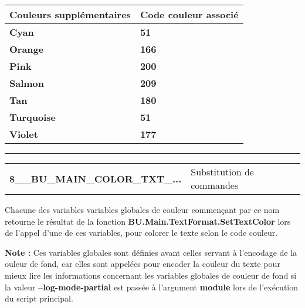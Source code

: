 \documentclass[a4paper,10pt]{article}
\begin{document}
\begin{justify}
    \begin{tabular}{|l|l|}
        \hline
        \textbf{Couleurs supplémentaires} & \textbf{Code couleur associé}\\
        \hline
        \textbf{\color{Cyan}Cyan} & \textbf{\color{Cyan}51}\\
        \hline
        \textbf{\color{Orange}Orange} & \textbf{\color{Orange}166}\\
        \hline
        \textbf{\color{Pink}Pink} & \textbf{\color{Pink}200}\\
        \hline
        \textbf{\color{Salmon}Salmon} & \textbf{\color{Salmon}209}\\
        \hline
        \textbf{\color{Tan}Tan} & \textbf{\color{Tan}180}\\
        \hline
        \textbf{\color{Turquoise}Turquoise} & \textbf{\color{Turquoise}51}\\
        \hline
        \textbf{\color{Violet}Violet} & \textbf{\color{Violet}177}\\
        \hline
    \end{tabular}
\end{justify}

\setlength{\parskip}{2em}


\par\noindent\rule{\textwidth}{0.4pt}

\setlength{\parskip}{1em}

\begin{justify}
    \begin{tabular}{l|l}
        \textbf{\color{vars}\$\_\_BU\_MAIN\_COLOR\_TXT\_...} & Substitution de commandes\\
    \end{tabular}
\end{justify}

\begin{justify}
    Chacune des variables variables globales de couleur commençant par ce nom retourne le résultat de la fonction \textbf{\color{func}BU.Main.TextFormat.SetTextColor} lors de l'appel d'une de ces variables, pour colorer le texte selon le code couleur.
\end{justify}

\begin{justify}
    \textbf{Note :} Ces variables globales sont définies avant celles servant à l'encodage de la ouleur de fond, car elles sont appelées pour encoder la couleur du texte pour mieux lire les informations concernant les variables globales de couleur de fond si la valeur \textbf{--log-mode-partial} est passée à l'argument \textbf{module} lors de l'exécution du script principal.
\end{justify}
\end{document}
